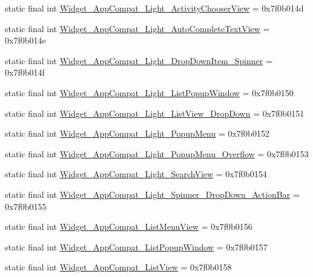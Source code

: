 \begin{CompactItemize}
\item 
static final int \hyperlink{classcom_1_1companyname_1_1x__2doo_1_1_r_1_1style_a1c5b7d6f281f144f0eb339ac9a20aaa}{Widget\_\-AppCompat\_\-Light\_\-ActivityChooserView} = 0x7f0b014d
\item 
static final int \hyperlink{classcom_1_1companyname_1_1x__2doo_1_1_r_1_1style_293f84109759132011145c4b79f78c34}{Widget\_\-AppCompat\_\-Light\_\-AutoCompleteTextView} = 0x7f0b014e
\item 
static final int \hyperlink{classcom_1_1companyname_1_1x__2doo_1_1_r_1_1style_aeecc2b63969268f3400ffe619251b6d}{Widget\_\-AppCompat\_\-Light\_\-DropDownItem\_\-Spinner} = 0x7f0b014f
\item 
static final int \hyperlink{classcom_1_1companyname_1_1x__2doo_1_1_r_1_1style_ab60f523beacac4a08965749e770fcbd}{Widget\_\-AppCompat\_\-Light\_\-ListPopupWindow} = 0x7f0b0150
\item 
static final int \hyperlink{classcom_1_1companyname_1_1x__2doo_1_1_r_1_1style_274778af0ec0966e53ac6e38333c01f9}{Widget\_\-AppCompat\_\-Light\_\-ListView\_\-DropDown} = 0x7f0b0151
\item 
static final int \hyperlink{classcom_1_1companyname_1_1x__2doo_1_1_r_1_1style_4df7db11f5e03e002d6abe547846ba49}{Widget\_\-AppCompat\_\-Light\_\-PopupMenu} = 0x7f0b0152
\item 
static final int \hyperlink{classcom_1_1companyname_1_1x__2doo_1_1_r_1_1style_25cd83ee29bb29470bb6fb44ce0b0bbd}{Widget\_\-AppCompat\_\-Light\_\-PopupMenu\_\-Overflow} = 0x7f0b0153
\item 
static final int \hyperlink{classcom_1_1companyname_1_1x__2doo_1_1_r_1_1style_3717944ad86556a79b87b68921f32731}{Widget\_\-AppCompat\_\-Light\_\-SearchView} = 0x7f0b0154
\item 
static final int \hyperlink{classcom_1_1companyname_1_1x__2doo_1_1_r_1_1style_b1995c75020facfc3aba51bffb0d1233}{Widget\_\-AppCompat\_\-Light\_\-Spinner\_\-DropDown\_\-ActionBar} = 0x7f0b0155
\item 
static final int \hyperlink{classcom_1_1companyname_1_1x__2doo_1_1_r_1_1style_0f5d0db7008c83ce23961fbb07c0122c}{Widget\_\-AppCompat\_\-ListMenuView} = 0x7f0b0156
\item 
static final int \hyperlink{classcom_1_1companyname_1_1x__2doo_1_1_r_1_1style_61ba50626bdde79f664c37e2142af11b}{Widget\_\-AppCompat\_\-ListPopupWindow} = 0x7f0b0157
\item 
static final int \hyperlink{classcom_1_1companyname_1_1x__2doo_1_1_r_1_1style_7f423dbeb0b28ea78a6d33e06b11ad96}{Widget\_\-AppCompat\_\-ListView} = 0x7f0b0158

\end{CompactItemize}
